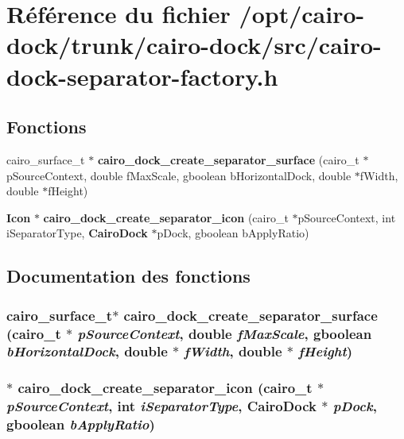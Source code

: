 \section{Référence du fichier /opt/cairo-dock/trunk/cairo-dock/src/cairo-dock-separator-factory.h}
\label{cairo-dock-separator-factory_8h}
\subsection*{Fonctions}
\begin{CompactItemize}
\item 
cairo\_\-surface\_\-t $\ast$ {\bf cairo\_\-dock\_\-create\_\-separator\_\-surface} (cairo\_\-t $\ast$pSourceContext, double fMaxScale, gboolean bHorizontalDock, double $\ast$fWidth, double $\ast$fHeight)
\item 
{\bf Icon} $\ast$ {\bf cairo\_\-dock\_\-create\_\-separator\_\-icon} (cairo\_\-t $\ast$pSourceContext, int iSeparatorType, {\bf CairoDock} $\ast$pDock, gboolean bApplyRatio)
\end{CompactItemize}


\subsection{Documentation des fonctions}
\subsubsection{\setlength{\rightskip}{0pt plus 5cm}cairo\_\-surface\_\-t$\ast$ cairo\_\-dock\_\-create\_\-separator\_\-surface (cairo\_\-t $\ast$ {\em pSourceContext}, double {\em fMaxScale}, gboolean {\em bHorizontalDock}, double $\ast$ {\em fWidth}, double $\ast$ {\em fHeight})}\label{cairo-dock-separator-factory_8h_a62ef285e32a79de3efc5be781079ab4}


\subsubsection{$\ast$ cairo\_\-dock\_\-create\_\-separator\_\-icon (cairo\_\-t $\ast$ {\em pSourceContext}, int {\em iSeparatorType}, {\bf CairoDock} $\ast$ {\em pDock}, gboolean {\em bApplyRatio})}\label{cairo-dock-separator-factory_8h_ddc2e2d9758a37515df4e26cb6b24fc1}


